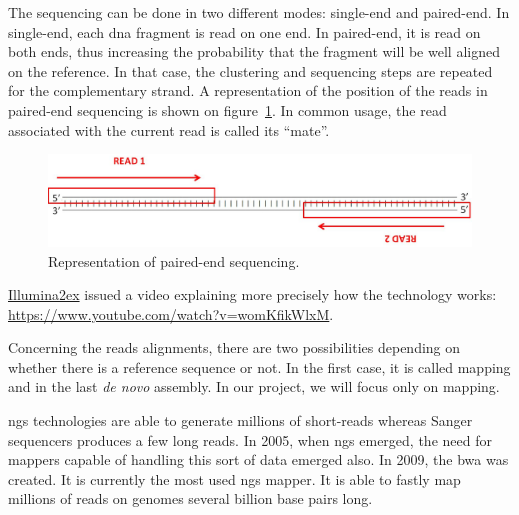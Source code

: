 The sequencing can be done in two different modes: single-end and paired-end.
In single-end, each \gls{dna} fragment is read on one end.
In paired-end, it is read on both ends, thus increasing the probability that the fragment will be well aligned on the reference.
In that case, the clustering and sequencing steps are repeated for the complementary strand.
A representation of the position of the reads in paired-end sequencing is shown on figure~\ref{fig:pairedEndSeq}.
In common usage, the read associated with the current read is called its ``mate''.

\begin{figure}[h]
    \includegraphics[width=\textwidth]{img/pairedEnd}
    \caption{Representation of paired-end sequencing.}\label{fig:pairedEndSeq}
\end{figure}

\href{http://www.illumina.com/}{Illumina\ttfamily\tiny\raise2ex\hbox{\textregistered}} issued a video explaining more precisely how the technology works:\\
\url{https://www.youtube.com/watch?v=womKfikWlxM}.

Concerning the reads alignments, there are two possibilities depending on whether there is a reference sequence or not.
In the first case, it is called mapping and in the last \emph{de novo} assembly.
In our project, we will focus only on mapping.

\gls{ngs} technologies are able to generate millions of short-reads whereas Sanger sequencers produces a few long reads.
In 2005, when \gls{ngs} emerged, the need for mappers capable of handling this sort of data emerged also.
In 2009, the \gls{bwa} was created. It is currently the most used \gls{ngs} mapper.
It is able to fastly map millions of reads on genomes several billion base pairs long.


